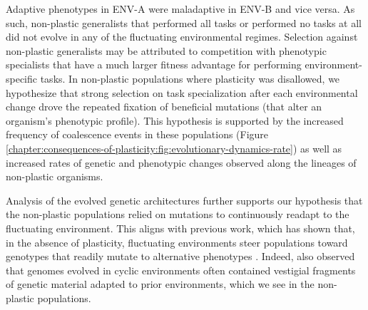 Adaptive phenotypes in ENV-A were maladaptive in ENV-B and vice versa.
As such, non-plastic generalists that performed all tasks or performed no tasks at all did not evolve in any of the fluctuating environmental regimes.
Selection against non-plastic generalists may be attributed to competition with phenotypic specialists that have a much larger fitness advantage for performing environment-specific tasks.
In non-plastic populations where plasticity was disallowed, we hypothesize that strong selection on task specialization after each environmental change drove the repeated fixation of beneficial mutations (that alter an organism's phenotypic profile).
This hypothesis is supported by the increased frequency of coalescence events in these populations (Figure \ref{chapter:consequences-of-plasticity:fig:evolutionary-dynamics-rate}) as well as increased rates of genetic and phenotypic changes observed along the lineages of non-plastic organisms. 

Analysis of the evolved genetic architectures further supports our hypothesis that the non-plastic populations relied on mutations to continuously readapt to the fluctuating environment. 
This aligns with previous work, which has shown that, in the absence of plasticity, fluctuating environments steer populations toward genotypes that readily mutate to alternative phenotypes \citep{lalejini_evolutionary_2016, canino-koning_evolution_2016}.
Indeed, \citep{canino-koning_evolution_2016} also observed that genomes evolved in cyclic environments often contained vestigial fragments of genetic material adapted to prior environments, which we see in the non-plastic populations. 

